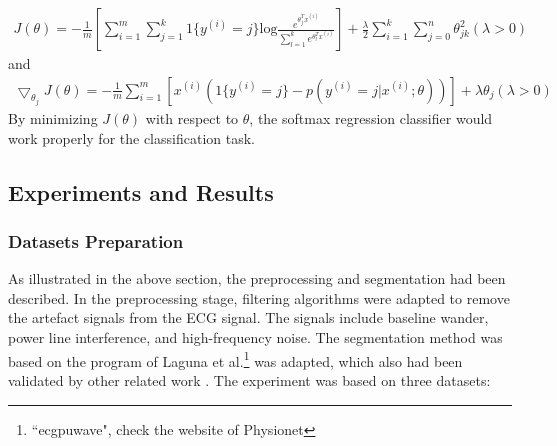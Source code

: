 \documentclass[graybox]{svmult}
\begin{document}
\begin{equation}
\begin{split}
J(\theta) = -\frac{1}{m}[\sum_{i=1}^m\sum_{j=1}^k1\{y^{(i)}=j\}\text{log}{\frac{e^{\theta_j^Tx^{(i)}}}{\sum_{l=1}^ke^{\theta_l^Tx^{(i)}}}}] 
+ \frac{\lambda}{2} \sum_{i=1}^k \sum_{j=0}^n \theta_{jk}^2 (\lambda>0)
\end{split}
\end{equation}
and
\begin{equation}
\begin{split}
\bigtriangledown_{\theta_j}J(\theta) = -\frac{1}{m}\sum_{i=1}^m[x^{(i)}(1\{y^{(i)}=j\}-p(y^{(i)}=j|x^{(i)};\theta))] 
+ \lambda\theta_j  (\lambda>0)
\end{split}
\end{equation}
By minimizing $J(\theta)$ with respect to $\theta$, the softmax regression classifier would work properly for the classification task.

\subsection{Experiments and Results}
\subsubsection{Datasets Preparation}
As illustrated in the above section, the preprocessing and segmentation had been described. In the preprocessing stage, filtering algorithms were adapted to remove the artefact signals from the ECG signal. The signals include baseline wander, power line interference, and high-frequency noise. The segmentation method was based on the program of Laguna et al.\footnote{``ecgpuwave", check the website of Physionet} was adapted, which also had been validated by other related work \citep{de2004automatic}.
The experiment was based on three datasets:
\end{document}
